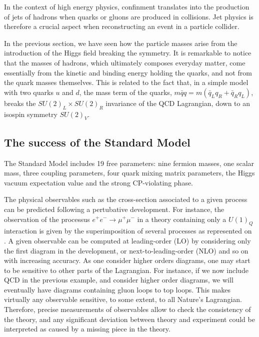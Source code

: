     In the context of high energy physics, confinment translates into the production of
    jets of hadrons when quarks or gluons are produced in collisions. Jet physics is
    therefore a crucial aspect when reconstructing an event in a particle collider.

    In the previous section, we have seen how the particle masses arise from the
    introduction of the Higgs field breaking the symmetry. It is remarkable to notice
    that the masses of hadrons, which ultimately composes everyday matter, come essentially
    from the kinetic and binding energy holding the quarks, and not from the quark masses
    themselves. This is related to the fact that, in a simple model with two quarks $u$ and
    $d$, the mass term of the quarks, $m\bar{q}q = m(\bar{q}_L q_R + \bar{q}_R q_L)$, breaks
    the $SU(2)_L \times SU(2)_R$ invariance of the QCD Lagrangian, down to an isospin symmetry
    $SU(2)_V$.

    \subsection{The success of the Standard Model \label{sec:standardModelSuccess}}


    The Standard Model includes 19 free parameters: nine fermion masses, one scalar mass,
    three coupling parameters, four quark mixing matrix parameters, the Higgs vacuum expectation
    value and the strong CP-violating phase.

    The physical observables such as the cross-section associated to a given process
    can be predicted following a pertubative development. For instance, the observation
    of the processus $e^+ e^- \rightarrow \mu^+ \mu^-$ in a theory containing only a $U(1)_Q$
    interaction is given by the superimposition of several processes as represented on
    . A given observable can be computed at leading-order
    (LO) by considering only the first diagram in the development, or next-to-leading-order (NLO) 
    and so on with increasing accuracy. As one consider higher orders diagrams, one may start
    to be sensitive to other parts of the Lagrangian. For instance, if we now include QCD in
    the previous example, and consider higher order diagrams, we will eventually have diagrams
    containing gluon loops to top loops. This makes virtually any observable sensitive,
    to some extent, to all Nature's Lagrangian. Therefore, precise measurements of observables
    allow to check the consistency of the theory, and any significant deviation between
    theory and experiment could be interpreted as caused by a missing piece in the theory.


